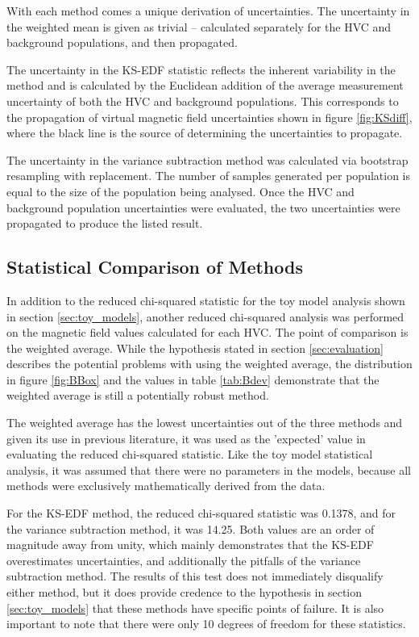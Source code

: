 With each method comes a unique derivation of uncertainties. The uncertainty in the weighted mean is given as trivial – calculated separately for the HVC and background populations, and then propagated.


The uncertainty in the KS-EDF statistic reflects the inherent variability in the method and is calculated by the Euclidean addition of the average measurement uncertainty of both the HVC and background populations. This corresponds to the propagation of virtual magnetic field uncertainties shown in figure \ref{fig:KSdiff}, where the black line is the source of determining the uncertainties to propagate.


The uncertainty in the variance subtraction method was calculated via bootstrap resampling with replacement. The number of samples generated per population is equal to the size of the population being analysed. Once the HVC and background population uncertainties were evaluated, the two uncertainties were propagated to produce the listed result.

\subsection{Statistical Comparison of Methods}
\label{ssec:results_stats}

In addition to the reduced chi-squared statistic for the toy model analysis shown in section \ref{sec:toy_models}, another reduced chi-squared analysis was performed on the magnetic field values calculated for each HVC. The point of comparison is the weighted average. While the hypothesis stated in section \ref{sec:evaluation} describes the potential problems with using the weighted average, the distribution in figure \ref{fig:BBox} and the values in table \ref{tab:Bdev} demonstrate that the weighted average is still a potentially robust method.


The weighted average has the lowest uncertainties out of the three methods and given its use in previous literature, it was used as the 'expected' value in evaluating the reduced chi-squared statistic. Like the toy model statistical analysis, it was assumed that there were no parameters in the models, because all methods were exclusively mathematically derived from the data.


For the KS-EDF method, the reduced chi-squared statistic was 0.1378, and for the variance subtraction method, it was 14.25. Both values are an order of magnitude away from unity, which mainly demonstrates that the KS-EDF overestimates uncertainties, and additionally the pitfalls of the variance subtraction method. The results of this test does not immediately disqualify either method, but it does provide credence to the hypothesis in section \ref{sec:toy_models} that these methods have specific points of failure. It is also important to note that there were only 10 degrees of freedom for these statistics.




